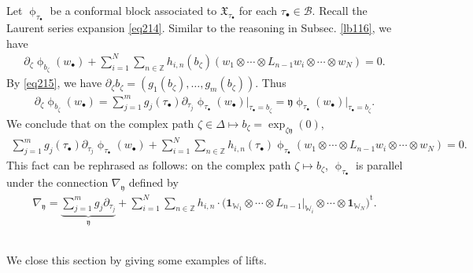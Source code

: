 \documentclass[11pt,b5paper,notitlepage]{article}
\theoremstyle{definition}
\theoremstyle{plain}
\newcommand{\fk}{\mathfrak}
\newcommand{\mc}{\mathcal}
\newcommand{\tr}{\mathrm{t}} %
\newcommand{\id}{\mathbf{1}}
\newcommand{\yk}{\mathfrak y}
\newcommand{\blt}{\bullet}
\newcommand{\Wbb}{\mathbb W}
\newcommand{\Zbb}{\mathbb Z}
\numberwithin{equation}{section}
\begin{document}
Let $\upphi_{\tau_\blt}$ be a conformal block associated to $\fk X_{\tau_\blt}$ for each $\tau_\blt\in\mc B$. Recall the Laurent series expansion \eqref{eq214}. Similar to the reasoning in Subsec. \ref{lb116}, we have
\begin{align}
\partial_\zeta\upphi_{b_\zeta}(w_\blt)+\sum_{i=1}^N\sum_{n\in\Zbb}h_{i,n}(b_\zeta)(w_1\otimes\cdots\otimes L_{n-1}w_i\otimes\cdots\otimes w_N)=0.
\end{align}
By \eqref{eq215}, we have $\partial_\zeta b_\zeta=(g_1(b_\zeta),\dots,g_m(b_\zeta))$. Thus
\begin{align*}
\partial_\zeta\upphi_{b_\zeta}(w_\blt)=\sum_{j=1}^m g_j(\tau_\blt)\partial_{\tau_j}\upphi_{\tau_\blt}(w_\blt)\big|_{\tau_\blt=b_\zeta}=\yk\upphi_{\tau_\blt}(w_\blt)\big|_{\tau_\blt=b_\zeta}.
\end{align*}
We conclude that on the complex path $\zeta\in\Delta\mapsto b_\zeta=\exp_{\zeta\yk}(0)$,
\begin{align}
\sum_{j=1}^m g_j(\tau_\blt)\partial_{\tau_j}\upphi_{\tau_\blt}(w_\blt)+ \sum_{i=1}^N\sum_{n\in\Zbb}h_{i,n}(\tau_\blt)\upphi_{\tau_\blt}(w_1\otimes\cdots\otimes L_{n-1}w_i\otimes\cdots\otimes w_N)=0.
\end{align}
This fact can be rephrased as follows: on the complex path $\zeta\mapsto b_\zeta$, $\upphi_{\tau_\blt}$ is parallel under the connection $\nabla_\yk$ defined by
\begin{align}
\nabla_{\yk}=\underbrace{\sum_{j=1}^m g_j\partial_{\tau_j}}_{\yk}+\sum_{i=1}^N\sum_{n\in\Zbb} h_{i,n}\cdot\big(\id_{\Wbb_1}\otimes\cdots\otimes L_{n-1}\big|_{\Wbb_i}\otimes\cdots\otimes\id_{\Wbb_N}\big)^\tr.\label{eq217}
\end{align}


\subsection{}

We close this section by giving some examples of lifts. 
\end{document}
